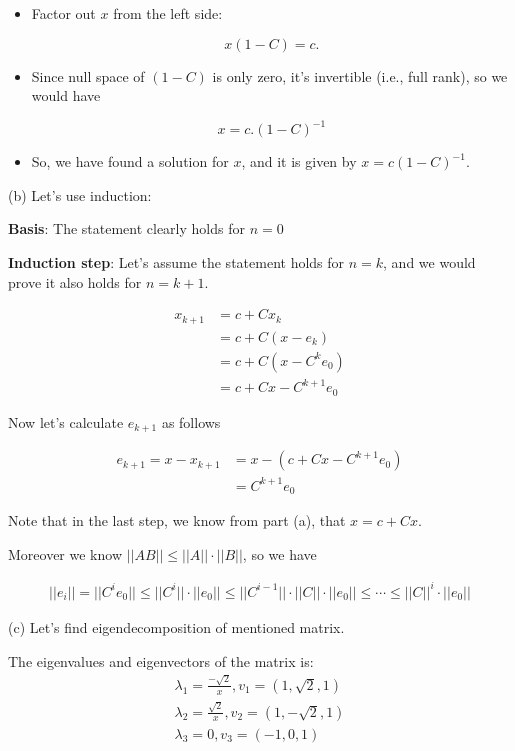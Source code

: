 \documentclass{article}
\begin{document}
\begin{enumerate}[leftmargin=\labelsep]
\begin{itemize}
		\item Factor out $x$ from the left side:
		
		\[x(1 - C) = c.\]
		
		\item Since null space of $(1 - C)$ is only zero, it's invertible (i.e., full rank), so we would have
		
		\[x = c.(1 - C)^{-1}\]
		
		\item So, we have found a solution for $x$, and it is given by $x = c(1 - C)^{-1}$. 
	\end{itemize}

	(b) Let's use induction:

	\textbf{Basis}: The statement clearly holds for $n = 0$

	\textbf{Induction step}: Let's assume the statement holds for $n = k$, and we would prove it also holds for $n = k+1$.

	\begin{align}
		x_{k+1} &= c + Cx_{k} \\
		&= c + C (x - e_k) \\
		&= c + C (x - C^ke_0)\\
		&= c+ Cx - C^{k+1}e_0
	\end{align}

	Now let's calculate $e_{k+1}$ as follows

	\begin{align}
		e_{k+1} = x - x_{k+1} &= x - (c+ Cx - C^{k+1}e_0)\\
		&=C^{k+1}e_0
	\end{align}
	
	Note that in the last step, we know from part (a), that $x = c + Cx$.

	Moreover we know $||AB||\leq ||A||\cdot||B||$, so we have

	\begin{align}
		||e_{i}|| = ||C^ie_0|| \leq ||C^i||\cdot||e_0|| \leq ||C^{i-1}||\cdot||C||\cdot||e_0|| \leq \cdots \leq ||C||^i\cdot||e_0||
	\end{align}

	(c) Let's find eigendecomposition of mentioned matrix. 

	The eigenvalues and eigenvectors of the matrix is:
	\begin{align}
		\lambda_1 = \frac{-\sqrt{2}}{x}, v_1 = (1, \sqrt{2}, 1)\\
		\lambda_2 = \frac{\sqrt{2}}{x}, v_2 = (1, -\sqrt{2}, 1)\\
		\lambda_3 = 0, v_3 = (-1, 0, 1)
	\end{align}


\end{enumerate}
\end{document}
